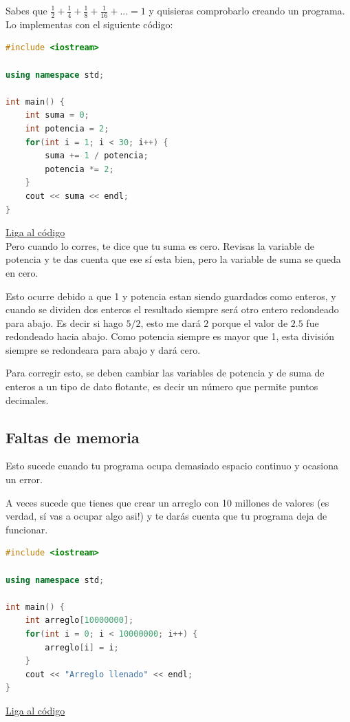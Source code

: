 \documentclass{article}
\begin{document}
Sabes que $\frac{1}{2} + \frac{1}{4} + \frac{1}{8} + \frac{1}{16} + ... = 1$ y quisieras comprobarlo creando un programa. Lo implementas con el siguiente código:

\begin{lstlisting}[language=C++, title=Error de redondeo]
#include <iostream>

using namespace std;

int main() {
	int suma = 0;
	int potencia = 2;
	for(int i = 1; i < 30; i++) {
		suma += 1 / potencia;
		potencia *= 2;
	}
	cout << suma << endl;
}
\end{lstlisting}
\href{https://repl.it/@Jamesscn/Suma-Fraccional}{Liga al código}\\

Pero cuando lo corres, te dice que tu suma es cero. Revisas la variable de potencia y te das cuenta que ese sí esta bien, pero la variable de suma se queda en cero.

Esto ocurre debido a que 1 y potencia estan siendo guardados como enteros, y cuando se dividen dos enteros el resultado siempre será otro entero redondeado para abajo. Es decir si hago $5 / 2$, esto me dará $2$ porque el valor de $2.5$ fue redondeado hacia abajo. Como potencia siempre es mayor que 1, esta división siempre se redondeara para abajo y dará cero.

Para corregir esto, se deben cambiar las variables de potencia y de suma de enteros a un tipo de dato flotante, es decir un número que permite puntos decimales.

\subsection{Faltas de memoria}
Esto sucede cuando tu programa ocupa demasiado espacio continuo y ocasiona un error.

A veces sucede que tienes que crear un arreglo con 10 millones de valores (es verdad, sí vas a ocupar algo asi!) y te darás cuenta que tu programa deja de funcionar.

\begin{lstlisting}[language=C++, title=Faltas de memoria]
#include <iostream>

using namespace std;

int main() {
	int arreglo[10000000];
	for(int i = 0; i < 10000000; i++) {
		arreglo[i] = i;
	}
	cout << "Arreglo llenado" << endl;
}
\end{lstlisting}
\href{https://repl.it/@Jamesscn/Arreglo-no-arreglado}{Liga al código}\\
\end{document}
